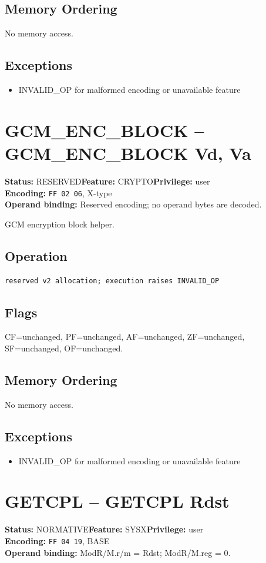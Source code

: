 \documentclass[10pt]{article}
\begin{document}
\subsection*{Memory Ordering}
No memory access.
\subsection*{Exceptions}
\begin{itemize}
\item INVALID\_OP for malformed encoding or unavailable feature
\end{itemize}
\clearpage

\section{GCM\_ENC\_BLOCK -- GCM\_ENC\_BLOCK Vd, Va}
\textbf{Status:} RESERVED\quad \textbf{Feature:} CRYPTO\quad \textbf{Privilege:} user\\
\textbf{Encoding:} \texttt{FF 02 06}, X-type\\
\textbf{Operand binding:} Reserved encoding; no operand bytes are decoded.

GCM encryption block helper.

\subsection*{Operation}
\begin{lstlisting}
reserved v2 allocation; execution raises INVALID_OP
\end{lstlisting}
\subsection*{Flags}
CF=unchanged, PF=unchanged, AF=unchanged, ZF=unchanged, SF=unchanged, OF=unchanged.
\subsection*{Memory Ordering}
No memory access.
\subsection*{Exceptions}
\begin{itemize}
\item INVALID\_OP for malformed encoding or unavailable feature
\end{itemize}
\clearpage

\section{GETCPL -- GETCPL Rdst}
\textbf{Status:} NORMATIVE\quad \textbf{Feature:} SYSX\quad \textbf{Privilege:} user\\
\textbf{Encoding:} \texttt{FF 04 19}, BASE\\
\textbf{Operand binding:} ModR/M.r/m = Rdst; ModR/M.reg = 0.
\end{document}
